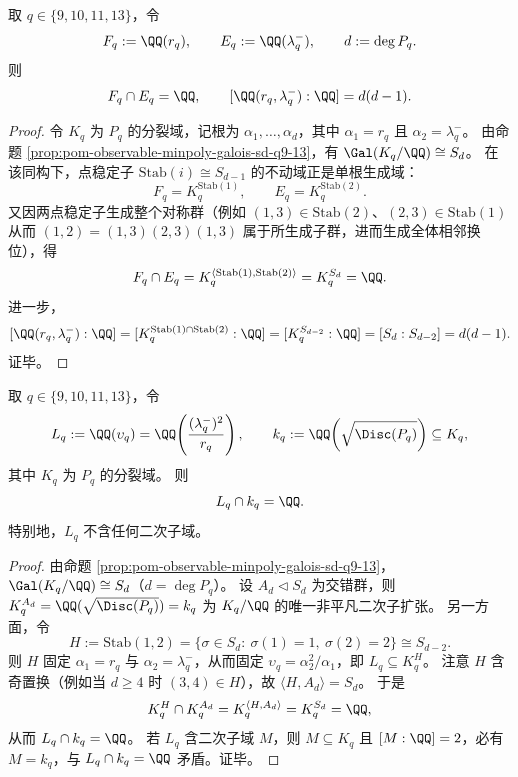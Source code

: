 \begin{proposition}\label{prop:pom-resonance-perron-negative-root-field-coprime-q9-13}
取 \(q\in\{9,10,11,13\}\)，令
\[
F_q:=\QQ(r_q),\qquad E_q:=\QQ(\lambda_q^-),\qquad d:=\deg P_q.
\]
则
\[
F_q\cap E_q=\QQ,
\qquad
[\QQ(r_q,\lambda_q^-):\QQ]=d(d-1).
\]
\end{proposition}
\begin{proof}
令 \(K_q\) 为 \(P_q\) 的分裂域，记根为 \(\alpha_1,\dots,\alpha_d\)，其中 \(\alpha_1=r_q\) 且 \(\alpha_2=\lambda_q^-\)。
由命题 \ref{prop:pom-observable-minpoly-galois-sd-q9-13}，有 \(\Gal(K_q/\QQ)\cong S_d\)。
在该同构下，点稳定子 \(\mathrm{Stab}(i)\cong S_{d-1}\) 的不动域正是单根生成域：
\[
F_q=K_q^{\mathrm{Stab}(1)},
\qquad
E_q=K_q^{\mathrm{Stab}(2)}.
\]
又因两点稳定子生成整个对称群（例如 \((1,3)\in\mathrm{Stab}(2)\)、\((2,3)\in\mathrm{Stab}(1)\) 从而 \((1,2)=(1,3)(2,3)(1,3)\) 属于所生成子群，进而生成全体相邻换位），得
\[
F_q\cap E_q
=K_q^{\langle \mathrm{Stab}(1),\mathrm{Stab}(2)\rangle}
=K_q^{S_d}
=\QQ.
\]
进一步，
\[
[\QQ(r_q,\lambda_q^-):\QQ]
=[K_q^{\mathrm{Stab}(1)\cap \mathrm{Stab}(2)}:\QQ]
=[K_q^{S_{d-2}}:\QQ]
=[S_d:S_{d-2}]
=d(d-1).
\]
证毕。
\end{proof}

\begin{proposition}\label{prop:pom-resonance-newman-field-discriminant-quadratic-disjoint}
取 \(q\in\{9,10,11,13\}\)，令
\[
L_q:=\QQ(\upsilon_q)=\QQ\!\left(\frac{(\lambda_q^-)^2}{r_q}\right),
\qquad
k_q:=\QQ\!\left(\sqrt{\Disc(P_q)}\right)\subseteq K_q,
\]
其中 \(K_q\) 为 \(P_q\) 的分裂域。
则
\[
L_q\cap k_q=\QQ.
\]
特别地，\(L_q\) 不含任何二次子域。
\end{proposition}
\begin{proof}
由命题 \ref{prop:pom-observable-minpoly-galois-sd-q9-13}，\(\Gal(K_q/\QQ)\cong S_d\)（\(d=\deg P_q\)）。
设 \(A_d\triangleleft S_d\) 为交错群，则 \(K_q^{A_d}=\QQ(\sqrt{\Disc(P_q)})=k_q\) 为 \(K_q/\QQ\) 的唯一非平凡二次子扩张。
另一方面，令
\[
H:=\mathrm{Stab}(1,2)=\{\sigma\in S_d:\ \sigma(1)=1,\ \sigma(2)=2\}\cong S_{d-2}.
\]
则 \(H\) 固定 \(\alpha_1=r_q\) 与 \(\alpha_2=\lambda_q^-\)，从而固定 \(\upsilon_q=\alpha_2^2/\alpha_1\)，即 \(L_q\subseteq K_q^{H}\)。
注意 \(H\) 含奇置换（例如当 \(d\ge 4\) 时 \((3,4)\in H\)），故 \(\langle H,A_d\rangle=S_d\)。
于是
\[
K_q^{H}\cap K_q^{A_d}=K_q^{\langle H,A_d\rangle}=K_q^{S_d}=\QQ,
\]
从而 \(L_q\cap k_q=\QQ\)。
若 \(L_q\) 含二次子域 \(M\)，则 \(M\subseteq K_q\) 且 \([M:\QQ]=2\)，必有 \(M=k_q\)，与 \(L_q\cap k_q=\QQ\) 矛盾。证毕。
\end{proof}

